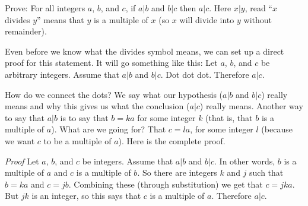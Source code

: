 \documentclass[11pt,]{book}
\makeatletter
\theoremstyle{ptxplainnotitle}
\theoremstyle{ptxplaintitle}
\renewcommand*{\proofname}{Proof}
\renewenvironment{proof}[1][\proofname]{\par
  \pushQED{\qed}%
  \normalfont \topsep6\p@\@plus6\p@\relax
  \trivlist
  \item\relax
    {\itshape
    #1\@addpunct{.}}\hspace\labelsep\ignorespaces
}{%
  \popQED\endtrivlist\@endpefalse
}
\theoremstyle{ptxdefinitionnotitle}
\theoremstyle{ptxdefinitiontitle}
\theoremstyle{ptxdefinitionnotitle}
\theoremstyle{ptxdefinitiontitle}
\theoremstyle{ptxdefinitionnotitle}
\theoremstyle{ptxdefinitiontitle}
\theoremstyle{ptxdefinitiontitlenonumber}
\theoremstyle{ptxdefinitiontitlenonumber}
\numberwithin{equation}{chapter}
\makeatother
\begin{document}
\begin{example}\label{example-64}
\hypertarget{p-2308}{}%
Prove: For all integers \(a\), \(b\), and \(c\), if \(a|b\) and \(b|c\) then \(a|c\). Here \(x|y\), read ``\(x\) divides \(y\)'' means that \(y\) is a multiple of \(x\) (so \(x\) will divide into \(y\) without remainder).%
\par\smallskip%
\noindent\textbf{}\hypertarget{solution-251}{}\hypertarget{p-2309}{}%
Even before we know what the divides symbol means, we can set up a direct proof for this statement. It will go something like this: Let \(a\), \(b\), and \(c\) be arbitrary integers. Assume that \(a|b\) and \(b|c\). Dot dot dot. Therefore \(a|c\).%
\par
\hypertarget{p-2310}{}%
How do we connect the dots? We say what our hypothesis (\(a|b\) and \(b|c\)) really means and why this gives us what the conclusion (\(a|c\)) really means. Another way to say that \(a|b\) is to say that \(b = ka\) for some integer \(k\) (that is, that \(b\) is a multiple of \(a\)). What are we going for? That \(c = la\), for some integer \(l\) (because we want \(c\) to be a multiple of \(a\)). Here is the complete proof.%
\begin{proof}\hypertarget{proof-23}{}
\hypertarget{p-2311}{}%
Let \(a\), \(b\), and \(c\) be integers. Assume that \(a|b\) and \(b|c\). In other words, \(b\) is a multiple of \(a\) and \(c\) is a multiple of \(b\). So there are integers \(k\) and \(j\) such that \(b = ka\) and \(c = jb\). Combining these (through substitution) we get that \(c = jka\). But \(jk\) is an integer, so this says that \(c\) is a multiple of \(a\). Therefore \(a|c\).%
\end{proof}
\end{example}
\typeout{************************************************}
\typeout{************************************************}
\end{document}
